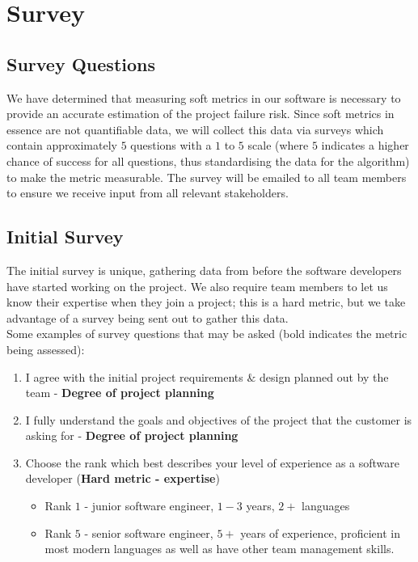 \documentclass[a4paper]{article}
\theoremstyle{plain}
\theoremstyle{definition}
\theoremstyle{remark}
\begin{document}
\section*{Survey}
\subsection*{Survey Questions}
We have determined that measuring soft metrics in our software is necessary to provide an accurate estimation of the project failure risk. Since soft metrics in essence are not quantifiable data, we will collect this data via surveys which contain approximately $5$ questions with a $1$ to $5 $ scale (where $5$ indicates a higher chance of success for all questions, thus standardising the data for the algorithm) to make the metric measurable. The survey will be emailed to all team members to ensure we receive input from all relevant stakeholders. 
\subsection*{Initial Survey}
The initial survey is unique, gathering data from before the software developers have started working on the project. We also require team members to let us know their expertise when they join a project; this is a hard metric, but we take advantage of a survey being sent out to gather this data. \\

\noindent Some examples of survey questions that may be asked (bold indicates the metric being assessed):
\begin{enumerate}
	\item I agree with the initial project requirements $\&$ design planned out by the team - \textbf{Degree of project planning}
\item I fully understand the goals and objectives of the project that the customer is asking for - \textbf{Degree of project planning}
\item Choose the rank which best describes your level of experience as a software developer (\textbf{Hard metric - expertise})
	\begin{itemize}
		\item Rank $1$ - junior software engineer, $1-3$ years, $2+$ languages 
		\item Rank $5$ - senior software engineer, $5+$ years of experience, proficient in most modern languages as well as have other team management skills.
	\end{itemize}
\end{enumerate}
\end{document}
